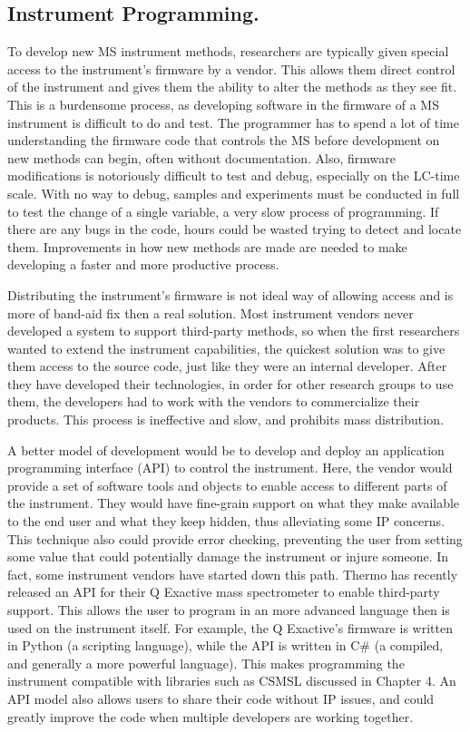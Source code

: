 \subsection*{Instrument Programming.}
To develop new MS instrument methods, researchers are typically given special access to the instrument's firmware by a vendor. This allows them direct control of the instrument and gives them the ability to alter the methods as they see fit. This is a burdensome process, as developing software in the firmware of a MS instrument is difficult to do and test. The programmer has to spend a lot of time understanding the firmware code that controls the MS before development on new methods can begin, often without documentation. Also, firmware modifications is notoriously difficult to test and debug, especially on the LC-time scale. With no way to debug, samples and experiments must be conducted in full to test the change of a single variable, a very slow process of programming. If there are any bugs in the code, hours could be wasted trying to detect and locate them. Improvements in how new methods are made are needed to make developing a faster and more productive process.

Distributing the instrument's firmware is not ideal way of allowing access and is more of band-aid fix then a real solution. Most instrument vendors never developed a system to support third-party methods, so when the first researchers wanted to extend the instrument capabilities, the quickest solution was to give them access to the source code, just like they were an internal developer. After they have developed their technologies, in order for other research groups to use them, the developers had to work with the vendors to commercialize their products. This process is ineffective and slow, and prohibits mass distribution. 

A better model of development would be to develop and deploy an application programming interface (API) to control the instrument. Here, the vendor would provide a set of software tools and objects to enable access to different parts of the instrument. They would have fine-grain support on what they make available to the end user and what they keep hidden, thus alleviating some IP concerns. This technique also could provide error checking, preventing the user from setting some value that could potentially damage the instrument or injure someone. In fact, some instrument vendors have started down this path. Thermo has recently released an API for their Q Exactive mass spectrometer to enable third-party support. This allows the user to program in an more advanced language then is used on the instrument itself. For example, the Q Exactive's firmware is written in Python (a scripting language), while the API is written in C\# (a compiled, and generally a more powerful language). This makes programming the instrument compatible with libraries such as CSMSL discussed in Chapter 4. An API model also allows users to share their code without IP issues, and could greatly improve the code when multiple developers are working together. 

